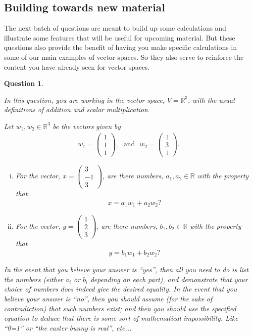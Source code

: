 \documentclass[12pt]{article}
\newtheorem{question}[thm]{Question}
\def\real{{\mathbb R}}
\newcommand{\ColVecThree}[3]{\begin{pmatrix} #1\\ #2\\ #3\end{pmatrix}}
\begin{document}
\vspace{0.4cm}









\subsection{Building towards new material}

The next batch of questions are meant to build up some calculations and illustrate some features that will be useful for upcoming material.  But these questions also provide the benefit of having you make specific calculations in some of our main examples of vector spaces. So they also serve to reinforce the content you have already seen for vector spaces.



\begin{question}\label{que:TowardsSpan}
	\normalfont
	
	In this question, you are working in the vector space, $V=\real^3$, with the usual definitions of addition and scalar multiplication.  
	
	Let $w_1, w_2\in\real^3$ be the vectors given by 
	\begin{align*}
		w_1 = \ColVecThree{1}{1}{1},\ \ \ \text{and}\ \ \ w_2 = \ColVecThree{1}{3}{1}.
	\end{align*}
	\begin{enumerate}[(i)]
		\item For the vector, $\displaystyle x = \ColVecThree{3}{-1}{3}$, are there numbers, $a_1,a_2\in\real$ with the property that
		\begin{align*}
			x = a_1 w_1 + a_2 w_2?
		\end{align*}
		
		\item For the vector, $\displaystyle y = \ColVecThree{1}{2}{3}$, are there numbers, $b_1,b_2\in\real$ with the property that
		\begin{align*}
			y = b_1 w_1 + b_2 w_2?
		\end{align*}
	\end{enumerate}
	
	
	In the event that you believe your answer is ``yes'', then all you need to do is list the numbers (either $a_i$ or $b_i$ depending on each part), and demonstrate that your choice of numbers does indeed give the desired equality.  In the event that you believe your answer is ``no'', then you should assume (for the sake of contradiction) that such numbers exist; and then you should use the specified equation to deduce that there is some sort of mathematical impossibility.  Like ``0=1'' or ``the easter bunny is real'', etc...
\end{question}
\end{document}
